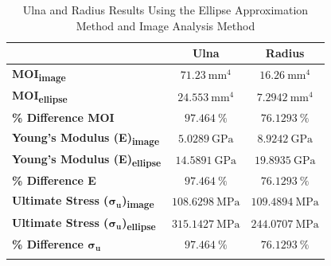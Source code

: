 \documentclass[conference, letterpaper]{IEEEtran}
\begin{document}
    \begin{table}[htbp]
        \caption{Ulna and Radius Results Using the Ellipse Approximation Method and Image Analysis Method}
        \begin{minipage}{\linewidth}
            \centering
            \begin{tabular}{lcc}
                \toprule{}
                & \textbf{Ulna} & \textbf{Radius} \\
                \midrule{}
                \hspace*{-1ex}\textbf{MOI\textsubscript{image}} & \(71.23\ \text{mm}^4\) & \(16.26\ \text{mm}^4\) \\
                \textbf{MOI\textsubscript{ellipse}} & \(24.553\ \text{mm}^4\) & \(7.2942\ \text{mm}^4\) \\
                \textbf{\% Difference MOI} & \(97.464\ \text{\%}\) & \(76.1293\ \text{\%}\) \\
                \midrule{}
                \hspace*{-1ex}\textbf{Young's Modulus (E)\textsubscript{image}} & \(5.0289\ \text{GPa}\) & \(8.9242\ \text{GPa}\) \\
                \textbf{Young's Modulus (E)\textsubscript{ellipse}} & \(14.5891\ \text{GPa}\) & \(19.8935\ \text{GPa}\) \\
                \textbf{\% Difference E} & \(97.464\ \text{\%}\) & \(76.1293\ \text{\%}\) \\
                \midrule{}
                \hspace*{-1ex}\textbf{Ultimate Stress (\(\bm{\sigma_u}\))\textsubscript{image}} & \(108.6298\ \text{MPa}\) & \(109.4894\ \text{MPa}\) \\
                \textbf{Ultimate Stress (\(\bm{\sigma_u}\))\textsubscript{ellipse}} & \(315.1427\ \text{MPa}\) & \(244.0707\ \text{MPa}\) \\
                \textbf{\% Difference \(\bm{\sigma_u}\)} & \(97.464\ \text{\%}\) & \(76.1293\ \text{\%}\) \\
                \bottomrule{}
            \end{tabular}\label{tbl_2}
            \vspace*{-\baselineskip}
        \end{minipage}
    \end{table}
\end{document}
